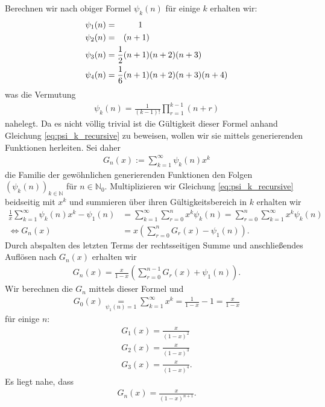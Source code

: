 \documentclass{article}
\begin{document}
Berechnen wir nach obiger Formel $\psi_k(n)$ für einige $k$ erhalten wir:
\begin{align*}
    \psi_1(n) = \hphantom{\frac{1}{2}(}  & \hphantom{n+} 1     \\
    \psi_2(n) = \hphantom{\frac{1}{2}} ( & n+1)                \\
    \psi_3(n) = \frac{1}{2} (            & n+1)(n+2)(n+3)      \\
    \psi_4(n) = \frac{1}{6} (            & n+1)(n+2)(n+3)(n+4)
\end{align*}
was die Vermutung
\begin{align}
    \psi_k(n) = \frac{1}{(k-1)!} \prod_{r=1}^{k-1}(n+r) \label{eq:psikn}
\end{align}
nahelegt. Da es nicht völlig trivial ist die Gültigkeit dieser Formel anhand Gleichung \ref{eq:psi_k_recursive} zu beweisen, wollen wir sie mittels generierenden Funktionen herleiten.
Sei daher
\begin{align*}
    G_n(x) := \sum_{k=1}^\infty \psi_k(n) x^k
\end{align*}
die Familie der gewöhnlichen generierenden Funktionen den Folgen $(\psi_k(n))_{k \in \mathbb{N}}$ für $n \in \mathbb{N}_0$. Multiplizieren wir Gleichung \ref{eq:psi_k_recursive} beidseitig mit $x^k$ und summieren über ihren Gültigkeitsbereich in $k$ erhalten wir
\begin{align*}
    \frac{1}{x}\sum_{k=1}^\infty \psi_k(n) x^k - \psi_1(n) & = \sum_{k=1}^\infty \sum_{r=0}^n x^k \psi_k(n) = \sum_{r=0}^n \sum_{k=1}^\infty x^k \psi_k(n) \\
    \iff G_n(x)                                            & = x (\sum_{r=0}^n G_r(x) - \psi_1(n)).
\end{align*}
Durch abspalten des letzten Terms der rechtsseitigen Summe und anschließendes Auflösen nach $G_n(x)$ erhalten wir
\begin{align}
    G_n(x) = \frac{x}{1-x} (\sum_{r=0}^{n-1} G_r(x) + \psi_1(n)).
\end{align}
Wir berechnen die $G_n$ mittels dieser Formel und
\begin{align*}
    G_0(x) \underset{\psi_1(n)=1}{=} \sum_{k=1}^\infty x^k = \frac{1}{1-x} - 1 = \frac{x}{1-x}
\end{align*}
für einige $n$:
\begin{align*}
    G_1(x) = \frac{x}{(1-x)^2} \\
    G_2(x) = \frac{x}{(1-x)^3} \\
    G_3(x) = \frac{x}{(1-x)^4}.
\end{align*}
Es liegt nahe, dass \begin{align}
    G_n(x) = \frac{x}{(1-x)^{n+1}}. \label{eq:Gn}
\end{align}
\end{document}
